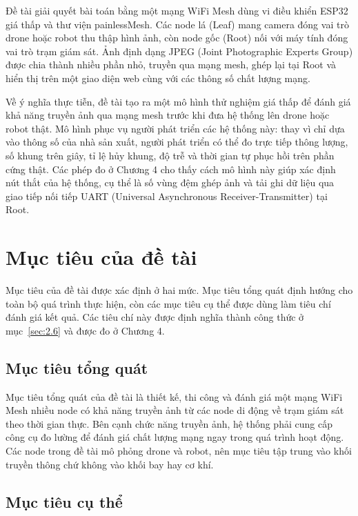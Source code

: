 Đề tài giải quyết bài toán bằng một mạng WiFi Mesh dùng vi điều khiển ESP32 giá thấp và thư viện painlessMesh. Các node lá (Leaf) mang camera đóng vai trò drone hoặc robot thu thập hình ảnh, còn node gốc (Root) nối với máy tính đóng vai trò trạm giám sát. Ảnh định dạng JPEG (Joint Photographic Experts Group) được chia thành nhiều phần nhỏ, truyền qua mạng mesh, ghép lại tại Root và hiển thị trên một giao diện web cùng với các thông số chất lượng mạng.

Về ý nghĩa thực tiễn, đề tài tạo ra một mô hình thử nghiệm giá thấp để đánh giá khả năng truyền ảnh qua mạng mesh trước khi đưa hệ thống lên drone hoặc robot thật. Mô hình phục vụ người phát triển các hệ thống này: thay vì chỉ dựa vào thông số của nhà sản xuất, người phát triển có thể đo trực tiếp thông lượng, số khung trên giây, tỉ lệ hủy khung, độ trễ và thời gian tự phục hồi trên phần cứng thật. Các phép đo ở Chương 4 cho thấy cách mô hình này giúp xác định nút thắt của hệ thống, cụ thể là số vùng đệm ghép ảnh và tải ghi dữ liệu qua giao tiếp nối tiếp UART (Universal Asynchronous Receiver-Transmitter) tại Root.


\section{Mục tiêu của đề tài}\label{sec:1.2}

Mục tiêu của đề tài được xác định ở hai mức. Mục tiêu tổng quát định hướng cho toàn bộ quá trình thực hiện, còn các mục tiêu cụ thể được dùng làm tiêu chí đánh giá kết quả. Các tiêu chí này được định nghĩa thành công thức ở mục~\ref{sec:2.6} và được đo ở Chương 4.

\subsection{Mục tiêu tổng quát}

Mục tiêu tổng quát của đề tài là thiết kế, thi công và đánh giá một mạng WiFi Mesh nhiều node có khả năng truyền ảnh từ các node di động về trạm giám sát theo thời gian thực. Bên cạnh chức năng truyền ảnh, hệ thống phải cung cấp công cụ đo lường để đánh giá chất lượng mạng ngay trong quá trình hoạt động. Các node trong đề tài mô phỏng drone và robot, nên mục tiêu tập trung vào khối truyền thông chứ không vào khối bay hay cơ khí.

\subsection{Mục tiêu cụ thể}

